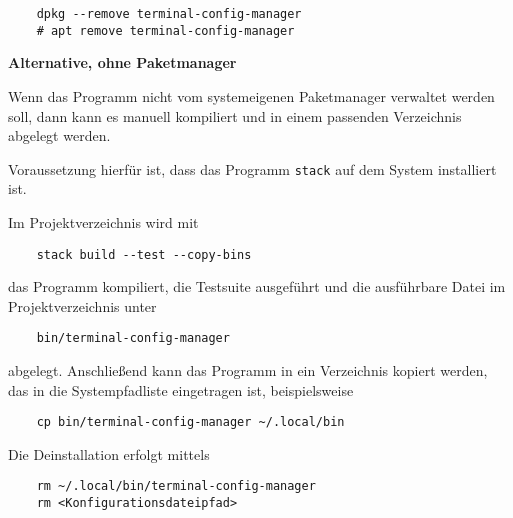 \begin{verbatim}
	dpkg --remove terminal-config-manager
	# apt remove terminal-config-manager
\end{verbatim}

\begin{center}
    \textbf{Alternative, ohne Paketmanager}
\end{center}

Wenn das Programm nicht vom systemeigenen Paketmanager verwaltet werden
soll, dann kann es manuell kompiliert und in einem passenden
Verzeichnis abgelegt werden.

Voraussetzung hierfür ist, dass das Programm \texttt{stack} auf dem
System installiert ist.

Im Projektverzeichnis wird mit

\begin{verbatim}
	stack build --test --copy-bins
\end{verbatim}

das Programm kompiliert, die Testsuite ausgeführt und die ausführbare Datei im
Projektverzeichnis unter

\begin{verbatim}
	bin/terminal-config-manager
\end{verbatim}

abgelegt. Anschließend kann das Programm in ein Verzeichnis kopiert werden, das in die
Systempfadliste eingetragen ist, beispielsweise

\begin{verbatim}
	cp bin/terminal-config-manager ~/.local/bin
\end{verbatim}

Die Deinstallation erfolgt mittels

\begin{verbatim}
	rm ~/.local/bin/terminal-config-manager
	rm <Konfigurationsdateipfad>
\end{verbatim}